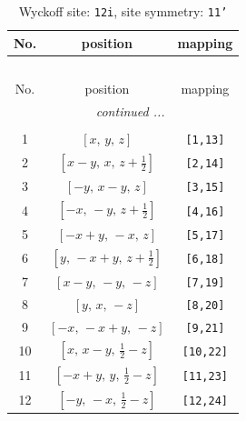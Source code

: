 \documentclass[fleqn,8pt]{jsarticle}
\begin{document}
\renewcommand{\arraystretch}{1.2}
\begin{longtable}{ccc}
\caption{Wyckoff site: {\tt 12i}, site symmetry: {\tt 11'}}
 \\
 \hline \hline
No. & position & mapping \\ \hline \endfirsthead

\multicolumn{2}{l}{\tablename\ \thetable{}} \\
 \hline \hline
No. & position & mapping \\ \hline \endhead

 \hline \hline
\multicolumn{2}{r}{\footnotesize\it continued ...} \\ \endfoot

 \hline \hline
\multicolumn{2}{r}{} \\ \endlastfoot

1 & $\left[ x,\, y,\, z \right]$ & {\tt [1,13]} \\ \hline
2 & $\left[ x - y,\, x,\, z + \frac{1}{2} \right]$ & {\tt [2,14]} \\ \hline
3 & $\left[ - y,\, x - y,\, z \right]$ & {\tt [3,15]} \\ \hline
4 & $\left[ - x,\, - y,\, z + \frac{1}{2} \right]$ & {\tt [4,16]} \\ \hline
5 & $\left[ - x + y,\, - x,\, z \right]$ & {\tt [5,17]} \\ \hline
6 & $\left[ y,\, - x + y,\, z + \frac{1}{2} \right]$ & {\tt [6,18]} \\ \hline
7 & $\left[ x - y,\, - y,\, - z \right]$ & {\tt [7,19]} \\ \hline
8 & $\left[ y,\, x,\, - z \right]$ & {\tt [8,20]} \\ \hline
9 & $\left[ - x,\, - x + y,\, - z \right]$ & {\tt [9,21]} \\ \hline
10 & $\left[ x,\, x - y,\, \frac{1}{2} - z \right]$ & {\tt [10,22]} \\ \hline
11 & $\left[ - x + y,\, y,\, \frac{1}{2} - z \right]$ & {\tt [11,23]} \\ \hline
12 & $\left[ - y,\, - x,\, \frac{1}{2} - z \right]$ & {\tt [12,24]} \\
\end{longtable}
\end{document}
